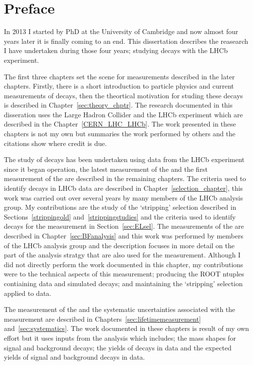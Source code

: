 \chapter{Preface}

In 2013 I started by PhD at the University of Cambridge and now almost four years later it is finally coming to an end. This dissertation describes the reasearch I have undertaken during those four years; studying \bmumu decays with the LHCb experiment. 

The first three chapters set the scene for measurements described in the later chapters. Firstly, there is a short introduction to particle physics and current measurements of \bmumu decays, then the theortical motivation for studing these decays is described in Chapter~\ref{sec:theory_chptr}. The research documented in this disseration uses the Large Hadron Collider and the LHCb experiment which are described in the Chapter~\ref{CERN_LHC_LHCb}. The work presented in these chapters is not my own but summaries the work performed by others and the citations show where credit is due.

The study of \bmumu decays has been undertaken using data from the LHCb experiment since it began operation, the latest measurement of the \bmumu \BFs and the first measurement of the \bsmumu \el are described in the remaining chapters.
The criteria used to identify \bmumu decays in LHCb data are described in Chapter~\ref{selection_chapter}, this work was carried out over several years by many members of the \bmumu LHCb analysis group. My contributions are the study of the `stripping' selection described in Sections~\ref{strippingold} and~\ref{strippingstudies} and the criteria used to identify \bsmumu decays for the \el measurement in Section~\ref{sec:ELsel}.
The measurements of the \bmumu \BFs are described in Chapter~\ref{sec:BFanalysis} and this work was performed by members of the \bmumu LHCb analysis group and the description focuses in more detail on the part of the analysis stratgy that are also used for the \el measurement. Although I did not directly perform the work documented in this chapter, my contributions were to the technical aspects of this measurement; producing the ROOT ntuples contiaining data and simulated decays; and maintaining the `stripping' selection applied to data. 

The measurement of the \bsmumu \el and the systematic uncertainties associated with the measurement are described in Chapters~\ref{sec:lifetimemeasurement} and~\ref{sec:systematics}. 
The work documented in these chapters is result of my own effort but it uses inputs from the \BF analysis which includes; the mass shapes for signal and background decays; the yields of \bsjpsiphi decays in data and the expected yields of signal and background decays in data. 

